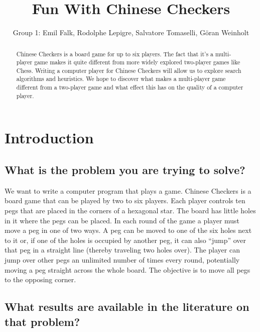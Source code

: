 \documentclass[a4paper,11pt]{report}
\begin{document}
\title{Fun With Chinese Checkers}
\author{Group 1: Emil Falk, Rodolphe Lepigre, Salvatore Tomaselli, Göran Weinholt}
\maketitle
\begin{abstract}\centering

Chinese Checkers is a board game for up to six players. The fact that
it's a multi-player game makes it quite different from more widely
explored two-player games like Chess. Writing a computer player for
Chinese Checkers will allow us to explore search algorithms and
heuristics. We hope to discover what makes a multi-player game
different from a two-player game and what effect this has on the
quality of a computer player.

\end{abstract}

\chapter{Introduction}
\section{What is the problem you are trying to solve?}

We want to write a computer program that plays a game. Chinese
Checkers is a board game that can be played by two to six players.
Each player controls ten pegs that are placed in the corners of a
hexagonal star. The board has little holes in it where the pegs can be
placed. In each round of the game a player must move a peg in one of
two ways. A peg can be moved to one of the six holes next to it or, if
one of the holes is occupied by another peg, it can also ``jump'' over
that peg in a straight line (thereby traveling two holes over). The
player can jump over other pegs an unlimited number of times every
round, potentially moving a peg straight across the whole board. The
objective is to move all pegs to the opposing corner.

\section{What results are available in the literature on that problem?}
\end{document}
